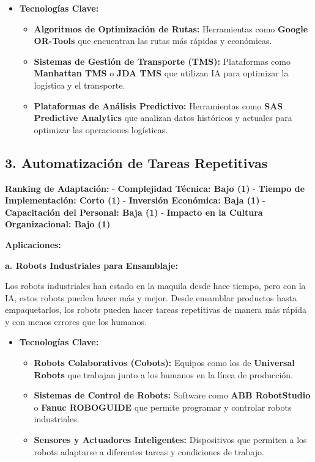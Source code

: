 \documentclass[
  10pt,
  letterpaper,
]{book}
\providecommand{\tightlist}{%
  \setlength{\itemsep}{0pt}\setlength{\parskip}{0pt}}\usepackage{longtable,booktabs,array}
\begin{document}
\begin{itemize}
\tightlist
\item
  \textbf{Tecnologías Clave:}

  \begin{itemize}
  \tightlist
  \item
    \textbf{Algoritmos de Optimización de Rutas:} Herramientas como
    \textbf{Google OR-Tools} que encuentran las rutas más rápidas y
    económicas.
  \item
    \textbf{Sistemas de Gestión de Transporte (TMS):} Plataformas como
    \textbf{Manhattan TMS} o \textbf{JDA TMS} que utilizan IA para
    optimizar la logística y el transporte.
  \item
    \textbf{Plataformas de Análisis Predictivo:} Herramientas como
    \textbf{SAS Predictive Analytics} que analizan datos históricos y
    actuales para optimizar las operaciones logísticas.
  \end{itemize}
\end{itemize}

\subsection{\texorpdfstring{3. \textbf{Automatización de Tareas
Repetitivas}}{3. Automatización de Tareas Repetitivas}}\label{automatizaciuxf3n-de-tareas-repetitivas}

\textbf{Ranking de Adaptación:} - \textbf{Complejidad Técnica: Bajo (1)}
- \textbf{Tiempo de Implementación: Corto (1)} - \textbf{Inversión
Económica: Baja (1)} - \textbf{Capacitación del Personal: Baja (1)} -
\textbf{Impacto en la Cultura Organizacional: Bajo (1)}

\textbf{Aplicaciones:}

\textbf{a. Robots Industriales para Ensamblaje:}

Los robots industriales han estado en la maquila desde hace tiempo, pero
con la IA, estos robots pueden hacer más y mejor. Desde ensamblar
productos hasta empaquetarlos, los robots pueden hacer tareas
repetitivas de manera más rápida y con menos errores que los humanos.

\begin{itemize}
\tightlist
\item
  \textbf{Tecnologías Clave:}

  \begin{itemize}
  \tightlist
  \item
    \textbf{Robots Colaborativos (Cobots):} Equipos como los de
    \textbf{Universal Robots} que trabajan junto a los humanos en la
    línea de producción.
  \item
    \textbf{Sistemas de Control de Robots:} Software como \textbf{ABB
    RobotStudio} o \textbf{Fanuc ROBOGUIDE} que permite programar y
    controlar robots industriales.
  \item
    \textbf{Sensores y Actuadores Inteligentes:} Dispositivos que
    permiten a los robots adaptarse a diferentes tareas y condiciones de
    trabajo.
  \end{itemize}
\end{itemize}
\end{document}
